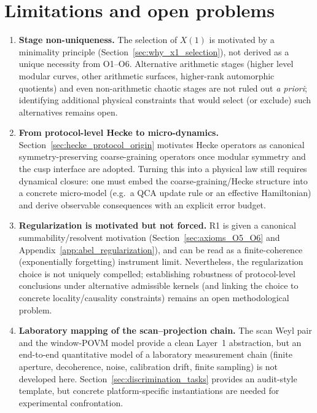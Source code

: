 \section{Limitations and open problems}
\label{app:limitations}

\begin{enumerate}
  \item \textbf{Stage non-uniqueness.}
  The selection of $X(1)$ is motivated by a minimality principle (Section~\ref{sec:why_x1_selection}), not derived as a unique necessity from O1--O6. Alternative arithmetic stages (higher level modular curves, other arithmetic surfaces, higher-rank automorphic quotients) and even non-arithmetic chaotic stages are not ruled out \emph{a priori}; identifying additional physical constraints that would select (or exclude) such alternatives remains open.

  \item \textbf{From protocol-level Hecke to micro-dynamics.}
  Section~\ref{sec:hecke_protocol_origin} motivates Hecke operators as canonical symmetry-preserving coarse-graining operators once modular symmetry and the cusp interface are adopted. Turning this into a physical law still requires dynamical closure: one must embed the coarse-graining/Hecke structure into a concrete micro-model (e.g.\ a QCA update rule or an effective Hamiltonian) and derive observable consequences with an explicit error budget.

  \item \textbf{Regularization is motivated but not forced.}
  R1 is given a canonical summability/resolvent motivation (Section~\ref{sec:axioms_O5_O6} and Appendix~\ref{app:abel_regularization}), and can be read as a finite-coherence (exponentially forgetting) instrument limit. Nevertheless, the regularization choice is not uniquely compelled; establishing robustness of protocol-level conclusions under alternative admissible kernels (and linking the choice to concrete locality/causality constraints) remains an open methodological problem.

  \item \textbf{Laboratory mapping of the scan--projection chain.}
  The scan Weyl pair and the window-POVM model provide a clean Layer~1 abstraction, but an end-to-end quantitative model of a laboratory measurement chain (finite aperture, decoherence, noise, calibration drift, finite sampling) is not developed here. Section~\ref{sec:discrimination_tasks} provides an audit-style template, but concrete platform-specific instantiations are needed for experimental confrontation.


\end{enumerate}
